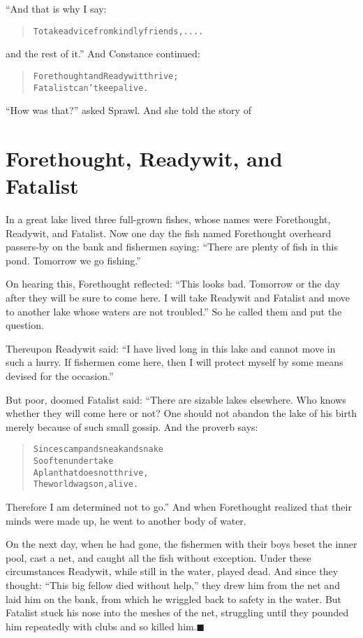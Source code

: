\documentclass[article, twoside, 14pt]{memoir}
\newcommand{\qed}{\hfill \ensuremath{\blacksquare}}
\renewenvironment{verbatim}{%
\begin{quote}%
\vskip -10pt%
\begin{alltt}\normalfont\large}{\end{alltt}%
\end{quote}%
\vskip -10pt
} %
\begin{document}
“And that is why I say:

\begin{verbatim}
To take advice from kindly friends, ....
\end{verbatim}
and the rest of it.” And Constance continued:

\begin{verbatim}
Forethought and Ready wit thrive;
Fatalist can't keep alive.
\end{verbatim}
``How was that?'' asked Sprawl. And she told the story of

\chapter{Forethought, Readywit, and Fatalist}

\label{s20}

In a great lake lived three full-grown fishes, whose names were
Forethought, Readywit, and Fatalist. Now one day the fish named
Forethought overheard passers-by on the bank and fishermen saying:
``There are plenty of fish in this pond. Tomorrow we go fishing.''

On hearing this, Forethought reflected:
``This looks bad. Tomorrow or the day after they will be sure to come here. I will take Readywit and Fatalist and move to another lake whose waters are not troubled.''
So he called them and put the question.

Thereupon Readywit said:
``I have lived long in this lake and cannot move in such a hurry. If fishermen come here, then I will protect myself by some means devised for the occasion.''

But poor, doomed Fatalist said: “There are sizable lakes elsewhere.
Who knows whether they will come here or not? One should not
abandon the lake of his birth merely because of such small gossip.
And the proverb says:

\begin{verbatim}
Since scamp and sneak and snake
So often undertake
A plan that does not thrive,
The world wags on, alive.
\end{verbatim}
Therefore I am determined not to go.” And when Forethought realized
that their minds were made up, he went to another body of water.

On the next day, when he had gone, the fishermen with their boys
beset the inner pool, cast a net, and caught all the fish without
exception. Under these circumstances Readywit, while still in the
water, played dead. And since they thought:
``This big fellow died without help,'' they drew him from the net
and laid him on the bank, from which he wriggled back to safety in
the water. But Fatalist stuck his nose into the meshes of the net,
struggling until they pounded him repeatedly with clubs and so
killed him.\hyperref[s20]{\qed}
\end{document}
